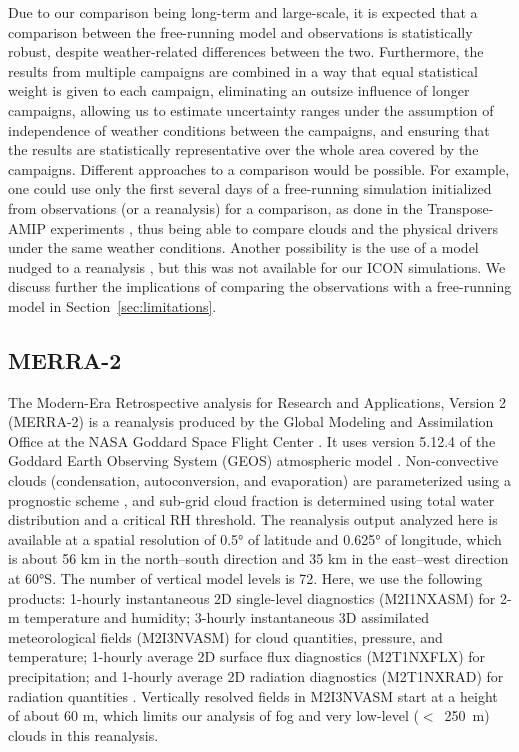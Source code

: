\documentclass[draft]{agujournal2019}
\begin{document}
Due to our comparison being long-term and large-scale, it is expected that a comparison between the free-running model and observations is statistically robust, despite weather-related differences between the two. Furthermore, the results from multiple campaigns are combined in a way that equal statistical weight is given to each campaign, eliminating an outsize influence of longer campaigns, allowing us to estimate uncertainty ranges under the assumption of independence of weather conditions between the campaigns, and ensuring that the results are statistically representative over the whole area covered by the campaigns. Different approaches to a comparison would be possible. For example, one could use only the first several days of a free-running simulation initialized from observations (or a reanalysis) for a comparison, as done in the Transpose-AMIP experiments \cite{williams2013}, thus being able to compare clouds and the physical drivers under the same weather conditions. Another possibility is the use of a model nudged to a reanalysis \cite{kuma2020}, but this was not available for our ICON simulations. We discuss further the implications of comparing the observations with a free-running model in Section~\ref{sec:limitations}.

\subsection{MERRA-2}

The Modern-Era Retrospective analysis for Research and Applications, Version 2 (MERRA-2) is a reanalysis produced by the Global Modeling and Assimilation Office at the NASA Goddard Space Flight Center \cite{gelaro2017}. It uses version 5.12.4 of the Goddard Earth Observing System (GEOS) atmospheric model \cite{rienecker2008,molod2015}. Non-convective clouds (condensation, autoconversion, and evaporation) are parameterized using a prognostic scheme \cite{bacmeister2006}, and sub-grid cloud fraction is determined using total water distribution and a critical RH threshold. The reanalysis output analyzed here is available at a spatial resolution of 0.5° of latitude and 0.625° of longitude, which is about 56 km in the north--south direction and 35 km in the east--west direction at 60°S. The number of vertical model levels is 72. Here, we use the following products: 1-hourly instantaneous 2D single-level diagnostics (M2I1NXASM) for 2-m temperature and humidity; 3-hourly instantaneous 3D assimilated meteorological fields (M2I3NVASM) for cloud quantities, pressure, and temperature; 1-hourly average 2D surface flux diagnostics (M2T1NXFLX) for precipitation; and 1-hourly average 2D radiation diagnostics (M2T1NXRAD) for radiation quantities \cite{merra2}. Vertically resolved fields in M2I3NVASM start at a height of about 60 m, which limits our analysis of fog and very low-level ($<$~250~m) clouds in this reanalysis.
\end{document}
